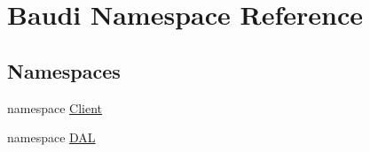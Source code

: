 \hypertarget{namespace_baudi}{}\section{Baudi Namespace Reference}
\label{namespace_baudi}
\subsection*{Namespaces}
\begin{DoxyCompactItemize}
\item 
namespace \hyperlink{namespace_baudi_1_1_client}{Client}
\item 
namespace \hyperlink{namespace_baudi_1_1_d_a_l}{D\+A\+L}
\end{DoxyCompactItemize}
